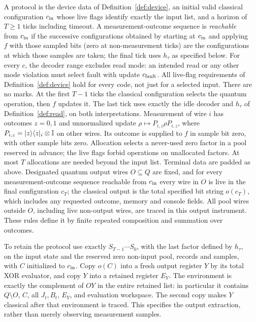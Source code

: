 \begin{definition}\label{def:adaptive}
A protocol is the device data of Definition~\ref{def:device}, an initial
valid classical configuration $c_{\rm in}$ whose live flags identify
exactly the input list, and a horizon of $T\geq1$ ticks including timeout.
A measurement-outcome sequence is \emph{reachable} from $c_{\rm in}$ if
the successive configurations obtained by starting at $c_{\rm in}$ and
applying $f$ with those sampled bits (zero at non-measurement ticks) are
the configurations at which those samples are taken; the final tick uses
$h_\tau$ as specified below.
For every $c$, the decoder range excludes read mode: an intended read
or any other mode violation must select fault with update $c_{\rm fault}$.
All live-flag requirements of Definition~\ref{def:device} hold for every
code, not just for a selected input. There are no marks. At the first
$T-1$ ticks the classical configuration selects the quantum operation,
then $f$ updates it. The last tick uses exactly the idle decoder and
$h_\tau$ of Definition~\ref{def:read}, on both interpretations.
Measurement of wire $i$ has outcomes $z=0,1$ and
unnormalized update $\rho\mapsto P_{i,z}\rho P_{i,z}$, where
$P_{i,z}=\lvert z\rangle\langle z\rvert_i\otimes\mathbb{I}$ on other wires. Its outcome is supplied
to $f$ in sample bit zero, with other sample bits zero.
Allocation selects a never-used zero factor in a pool reserved
in advance; the live flags forbid operations on unallocated factors.
At most $T$ allocations are needed beyond the input list. Terminal data
are padded as above. Designated quantum output wires $O\subseteq Q$ are
fixed, and for every measurement-outcome sequence reachable from
$c_{\rm in}$ every wire in $O$ is live in the final configuration $c_T$;
the classical output is
the total specified bit string $o(c_T)$, which includes any requested
outcome, memory and console fields. All pool wires outside $O$, including
live non-output wires, are traced in this output instrument. These rules
define it by finite repeated composition and summation over outcomes.

To retain the protocol use exactly $S_{T-1}\cdots S_0$, with the last
factor defined by $h_\tau$, on the input state and the reserved zero
non-input pool, records and samples, with $C$ initialized to $c_{\rm in}$.
Copy $o(C)$ into a fresh output register
$Y$ by its total XOR evaluator, and copy $Y$ into a retained register $E_Y$.
The environment is exactly the complement of $OY$ in the entire retained
list: in particular it contains $Q\setminus O$, $C$, all $J_t,B_t$,
$E_Y$, and evaluation workspace. The second copy makes $Y$
classical after that environment is traced. This specifies the output
extraction, rather than merely observing measurement samples.
\end{definition}

